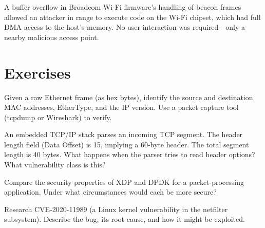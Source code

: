 \begin{example}
	A buffer overflow in Broadcom Wi-Fi firmware's handling of beacon frames allowed an attacker in range to execute code on the Wi-Fi chipset, which had full DMA access to the host's memory. No user interaction was required---only a nearby malicious access point.
\end{example}

\section{Exercises}

\begin{exercise}
	Given a raw Ethernet frame (as hex bytes), identify the source and destination MAC addresses, EtherType, and the IP version. Use a packet capture tool (tcpdump or Wireshark) to verify.
\end{exercise}

\begin{exercise}
	An embedded TCP/IP stack parses an incoming TCP segment. The header length field (Data Offset) is 15, implying a 60-byte header. The total segment length is 40 bytes. What happens when the parser tries to read header options? What vulnerability class is this?
\end{exercise}

\begin{exercise}
	Compare the security properties of XDP and DPDK for a packet-processing application. Under what circumstances would each be more secure?
\end{exercise}

\begin{exercise}
	Research CVE-2020-11989 (a Linux kernel vulnerability in the netfilter subsystem). Describe the bug, its root cause, and how it might be exploited.
\end{exercise}

